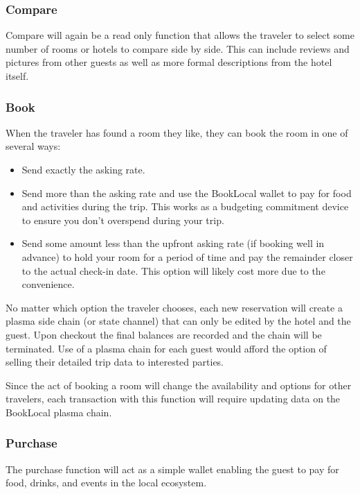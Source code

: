 \documentclass{article}
\begin{document}
\subsubsection{Compare}
Compare will again be a read only function that allows the traveler to select some number of rooms or hotels to compare side by side. This can include reviews and pictures from other guests as well as more formal descriptions from the hotel itself.

\subsubsection{Book}
When the traveler has found a room they like, they can book the room in one of several ways: 
\begin{itemize}
 \item Send exactly the asking rate.
 \item Send more than the asking rate and use the BookLocal wallet to pay for food and activities during the trip. This works as a budgeting commitment device to ensure you don't overspend during your trip. 
 \item Send some amount less than the upfront asking rate (if booking well in advance) to hold your room for a period of time and pay the remainder closer to the actual check-in date. This option will likely cost more due to the convenience. 
\end{itemize}
No matter which option the traveler chooses, each new reservation will create a plasma side chain (or state channel) that can only be edited by the hotel and the guest. Upon checkout the final balances are recorded and the chain will be terminated. Use of a plasma chain for each guest would afford the option of selling their detailed trip data to interested parties. 

\begin{flushleft}
Since the act of booking a room will change the availability and options for other travelers, each transaction with this function will require updating data on the BookLocal plasma chain. 
\end{flushleft}

\subsubsection{Purchase}
The purchase function will act as a simple wallet enabling the guest to pay for food, drinks, and events in the local ecosystem. 
\end{document}
